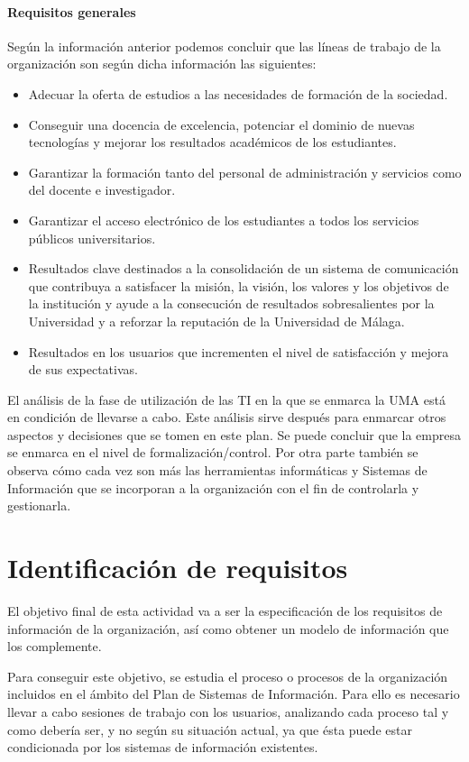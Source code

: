 \documentclass[11pt,a4paper,spanish,twoside]{book}
\begin{document}
\subsubsection{Requisitos generales}
Según la información anterior podemos concluir que las líneas de trabajo de
la organización son según dicha información las siguientes: 
\begin{itemize}
\item Adecuar la oferta de estudios a las necesidades de formación de la
sociedad.
\item Conseguir una docencia de excelencia, potenciar el dominio de nuevas
tecnologías y mejorar los resultados académicos de los estudiantes.
\item Garantizar la formación tanto del personal de administración y servicios
como del docente e investigador.
\item Garantizar el acceso electrónico de los estudiantes a todos los servicios
públicos universitarios.
\item Resultados clave destinados a la consolidación de un sistema de
comunicación que contribuya a satisfacer la misión, la visión, los valores
y los objetivos de la institución y ayude a la consecución de resultados
sobresalientes por la Universidad y a reforzar la reputación de la
Universidad de Málaga.
\item Resultados en los usuarios que incrementen el nivel de satisfacción y
mejora de sus expectativas.
\end{itemize}
        
El análisis de la fase de utilización de las TI en la que se enmarca la 
UMA está en condición de llevarse a cabo. Este análisis sirve después
para enmarcar otros aspectos y decisiones que se tomen en este plan. Se puede
concluir que la empresa se enmarca en el nivel de formalización/control. Por
otra parte también se observa cómo cada vez son más las herramientas
informáticas y Sistemas de Información que se incorporan a la organización
con el fin de controlarla y gestionarla. 

\chapter{Identificación de requisitos}
El objetivo final de esta actividad va a ser la especificación de los
requisitos de información de la organización, así como obtener un modelo de
información que los complemente.

Para conseguir este objetivo, se estudia el proceso o procesos de la
organización incluidos en el ámbito del Plan de Sistemas de Información. Para
ello es necesario llevar a cabo sesiones de trabajo con los usuarios,
analizando cada proceso tal y como debería ser, y no según su situación
actual, ya que ésta puede estar condicionada por los sistemas de información
existentes. 
\end{document}
